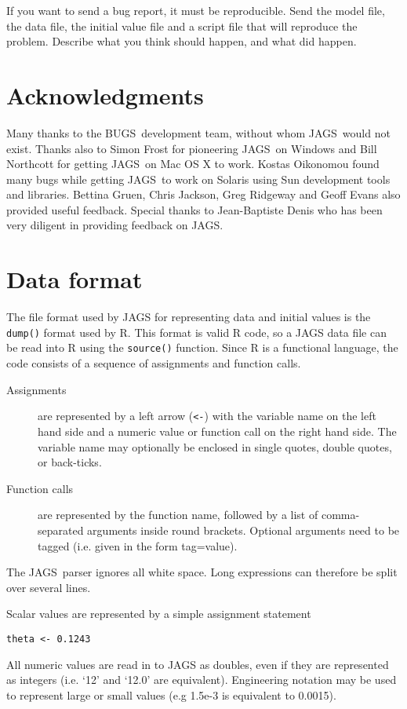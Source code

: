 \documentclass[11pt, a4paper, titlepage]{report}
\newcommand{\JAGS}{\textsf{JAGS}}
\newcommand{\BUGS}{\textsf{BUGS}}
\begin{document}
If you want to send a bug report, it must be reproducible. Send the
model file, the data file, the initial value file and a script file
that will reproduce the problem. Describe what you think should
happen, and what did happen.

\chapter{Acknowledgments}

Many thanks to the \BUGS\ development team, without whom \JAGS\ would
not exist.  Thanks also to Simon Frost for pioneering \JAGS\ on
Windows and Bill Northcott for getting \JAGS\ on Mac OS X to
work. Kostas Oikonomou found many bugs while getting \JAGS\ to work on
Solaris using Sun development tools and libraries.  Bettina Gruen,
Chris Jackson, Greg Ridgeway and Geoff Evans also provided useful
feedback.  Special thanks to Jean-Baptiste Denis who has been very
diligent in providing feedback on JAGS.

\appendix
\chapter{Data format}
\label{appendix:data}

The file format used by JAGS for representing data and initial values
is the \verb+dump()+ format used by R.  This format is valid R code,
so a JAGS data file can be read into R using the \verb+source()+ function.
Since R is a functional language, the code consists of a sequence
of assignments and function calls.
\begin{description}
\item[Assignments] are represented by a left arrow (\verb+<-+) with
  the variable name on the left hand side and a numeric value or
  function call on the right hand side. The variable name may
  optionally be enclosed in single quotes, double quotes, or back-ticks.
\item[Function calls] are represented by the function name, followed
  by a list of comma-separated arguments inside round brackets.
  Optional arguments need to be tagged (i.e. given in the form
  tag=value).
\end{description}
The \JAGS\ parser ignores all white space.  Long expressions can
therefore be split over several lines.

Scalar values are represented by a simple assignment statement 
\begin{verbatim}
theta <- 0.1243
\end{verbatim}
All numeric values are read in to JAGS as doubles, even if they are
represented as integers (i.e. `12' and `12.0' are
equivalent). Engineering notation may be used to represent large or
small values (e.g 1.5e-3 is equivalent to 0.0015).
\end{document}
